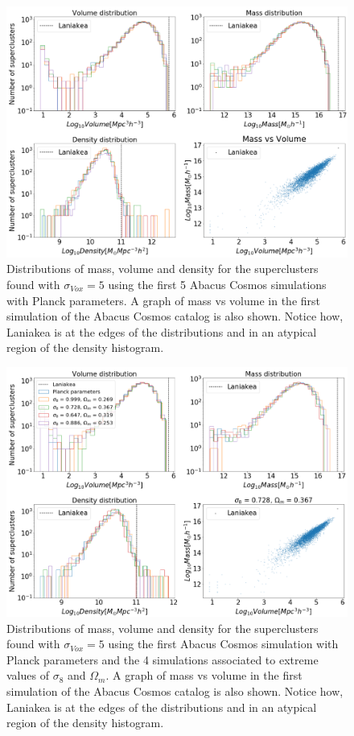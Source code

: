 \documentclass[usenatbib]{mnras}
\begin{document}
\begin{figure}
    \centering
    \includegraphics[width=435pt]{mass_vol_planck.pdf}
    \caption{Distributions of mass, volume and density for the
      superclusters found with $\sigma_{Vox} = 5$ using the first 5
      Abacus Cosmos simulations with Planck parameters. A graph of
      mass vs volume in the first simulation of the Abacus Cosmos
      catalog is also shown. Notice how, Laniakea is at the edges of
      the distributions and in an atypical region of the density
      histogram. } 
    \label{fig:HISTVMD1}
\end{figure}


\begin{figure}
    \centering
    \includegraphics[width=435pt]{mass_vol_different.pdf}
    \caption{Distributions of mass, volume and density for the
      superclusters found with $\sigma_{Vox} = 5$ using the first
      Abacus Cosmos simulation with Planck parameters and the 4
      simulations associated to extreme values of $\sigma_8$ and
      $\Omega_m$. A graph of mass vs volume in the first simulation of
      the Abacus Cosmos catalog is also shown. Notice how, Laniakea is
      at the edges of the distributions and in an atypical region of
      the density histogram. } 
    \label{fig:HISTVMD2}
\end{figure}
\end{document}
